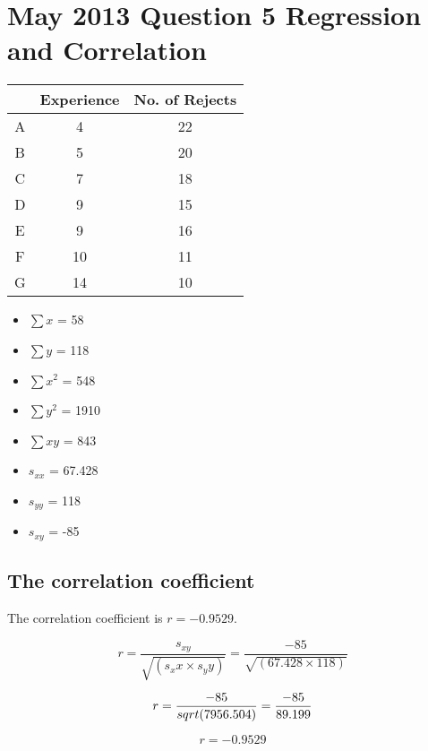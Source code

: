 \documentclass[]{report}
\begin{document}
\section*{May 2013 Question 5 Regression and Correlation}
\begin{center}
	\begin{tabular}{|c|c|c|}
		\hline  & Experience & No. of Rejects \\ 
		\hline A & 4 & 22 \\ 
		\hline B & 5 & 20 \\ 
		\hline C & 7 & 18 \\ 
		\hline D & 9 & 15 \\ 
		\hline E & 9 & 16 \\ 
		\hline F & 10 & 11 \\ 
		\hline G & 14 & 10 \\ 
		\hline 
	\end{tabular} 
\end{center}

\begin{itemize}
	\item $\sum x$ = 58
	\item $\sum y$ = 118
	\item $\sum x^2$ = 548
	\item $\sum y^2$ = 1910
	\item $\sum xy$ = 843
\end{itemize}

\begin{itemize}
	\item $s_{xx}$ = 67.428
	\item $s_{yy}$ = 118
	\item $s_{xy}$ = -85
\end{itemize}
\subsection*{The correlation coefficient}
The correlation coefficient is $r = -0.9529$.

\[ r = \frac{s_{xy}}{\sqrt{(s_xx \times s_yy)}}= \frac{-85}{\sqrt{(67.428 \times 118)}}\]

\[r= \frac{-85}{sqrt{(7956.504)}} =  {-85 \over 89.199}  \]

\[r = -0.9529\]
\end{document}
